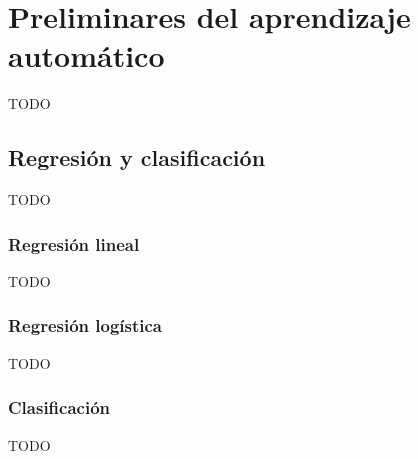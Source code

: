 \section{Preliminares del aprendizaje automático}

TODO


\subsection{Regresión y clasificación}

TODO


\subsubsection*{Regresión lineal}

TODO


\subsubsection*{Regresión logística}

TODO


\subsubsection*{Clasificación}

TODO
